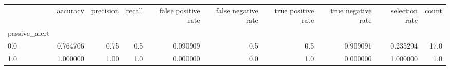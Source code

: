 \begin{tabular}{lrrrrrrrrr}
\toprule
{} &  accuracy &  precision &  recall &  false positive rate &  false negative rate &  true positive rate &  true negative rate &  selection rate &  count \\
passive\_alert &           &            &         &                      &                      &                     &                     &                 &        \\
\midrule
0.0           &  0.764706 &       0.75 &     0.5 &             0.090909 &                  0.5 &                 0.5 &            0.909091 &        0.235294 &   17.0 \\
1.0           &  1.000000 &       1.00 &     1.0 &             0.000000 &                  0.0 &                 1.0 &            0.000000 &        1.000000 &    1.0 \\
\bottomrule
\end{tabular}
